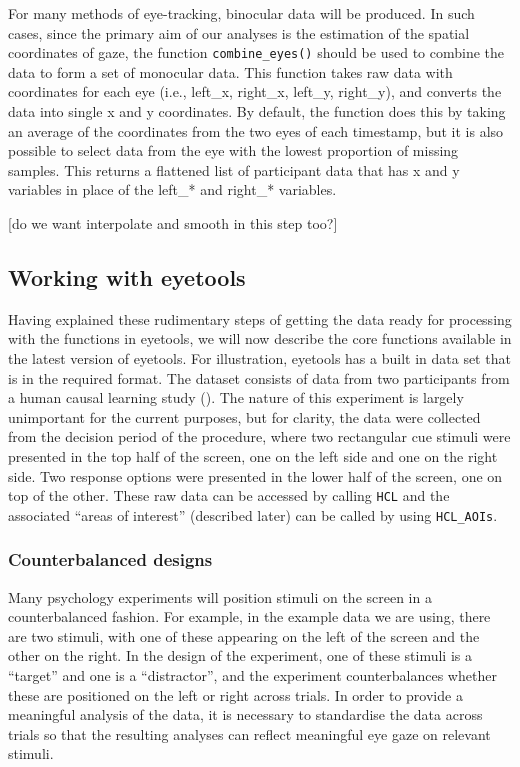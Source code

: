 \documentclass[
  man,
  floatsintext,
  longtable,
  nolmodern,
  notxfonts,
  notimes,
  colorlinks=true,linkcolor=blue,citecolor=blue,urlcolor=blue]{apa7}
\begin{document}
For many methods of eye-tracking, binocular data will be produced. In
such cases, since the primary aim of our analyses is the estimation of
the spatial coordinates of gaze, the function \texttt{combine\_eyes()}
should be used to combine the data to form a set of monocular data. This
function takes raw data with coordinates for each eye (i.e., left\_x,
right\_x, left\_y, right\_y), and converts the data into single x and y
coordinates. By default, the function does this by taking an average of
the coordinates from the two eyes of each timestamp, but it is also
possible to select data from the eye with the lowest proportion of
missing samples. This returns a flattened list of participant data that
has x and y variables in place of the left\_* and right\_* variables.

{[}do we want interpolate and smooth in this step too?{]}

\subsection{Working with eyetools}\label{working-with-eyetools}

Having explained these rudimentary steps of getting the data ready for
processing with the functions in eyetools, we will now describe the core
functions available in the latest version of eyetools. For illustration,
eyetools has a built in data set that is in the required format. The
dataset consists of data from two participants from a human causal
learning study (). The
nature of this experiment is largely unimportant for the current
purposes, but for clarity, the data were collected from the decision
period of the procedure, where two rectangular cue stimuli were
presented in the top half of the screen, one on the left side and one on
the right side. Two response options were presented in the lower half of
the screen, one on top of the other. These raw data can be accessed by
calling \texttt{HCL} and the associated ``areas of interest'' (described
later) can be called by using \texttt{HCL\_AOIs}.

\subsubsection{Counterbalanced designs}\label{counterbalanced-designs}

Many psychology experiments will position stimuli on the screen in a
counterbalanced fashion. For example, in the example data we are using,
there are two stimuli, with one of these appearing on the left of the
screen and the other on the right. In the design of the experiment, one
of these stimuli is a ``target'' and one is a ``distractor'', and the
experiment counterbalances whether these are positioned on the left or
right across trials. In order to provide a meaningful analysis of the
data, it is necessary to standardise the data across trials so that the
resulting analyses can reflect meaningful eye gaze on relevant stimuli.
\end{document}

